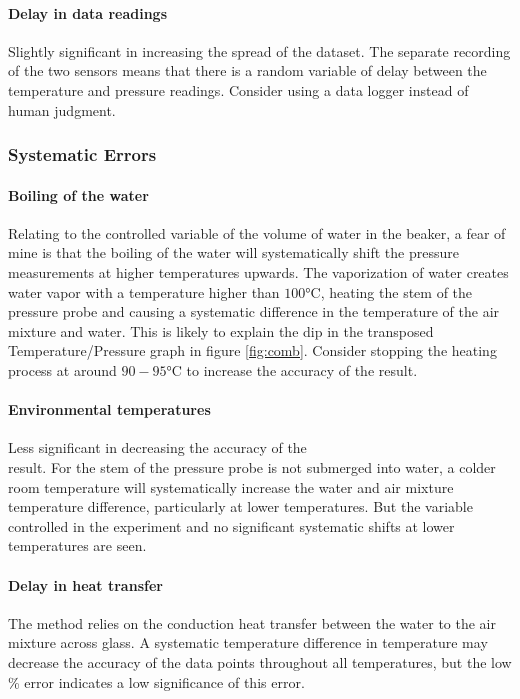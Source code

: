 \documentclass[a4paper,12pt]{article}
\begin{document}
\paragraph{Delay in data readings}
Slightly significant in increasing the spread of the dataset. The separate recording of the two sensors means that there is a random variable of delay between the temperature and pressure readings. Consider using a data logger instead of human judgment.

\subsubsection{Systematic Errors}
\paragraph{Boiling of the water}
Relating to the controlled variable of the volume of water in the beaker, a fear of mine is that the boiling of the water will systematically shift the pressure measurements at higher temperatures upwards. The vaporization of water creates water vapor with a temperature higher than $100\si{\celsius}$, heating the stem of the pressure probe and causing a systematic difference in the temperature of the air mixture and water. This is likely to explain the dip in the transposed Temperature/Pressure graph in figure \ref{fig:comb}. Consider stopping the heating process at around $90-95\si{\celsius}$ to increase the accuracy of the result.

\paragraph{Environmental temperatures}
Less significant in decreasing the accuracy of the \\result. For the stem of the pressure probe is not submerged into water, a colder room temperature will systematically increase the water and air mixture temperature difference, particularly at lower temperatures. But the variable controlled in the experiment and no significant systematic shifts at lower temperatures are seen.

\paragraph{Delay in heat transfer}
The method relies on the conduction heat transfer between the water to the air mixture across glass. A systematic temperature difference in temperature may decrease the accuracy of the data points throughout all temperatures, but the low \% error indicates a low significance of this error.
\end{document}
